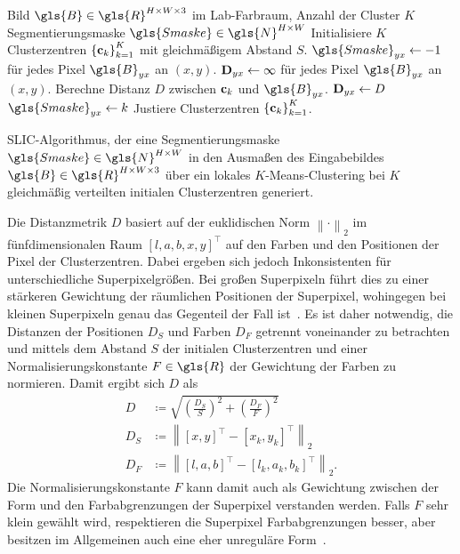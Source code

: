 \begin{algorithm}[t]
\centering
\begin{algorithmic}
  \REQUIRE{} Bild $\gls{B} \in \gls{R}^{H \times W \times 3}$ im Lab-Farbraum, Anzahl der Cluster $K$
  \ENSURE{} Segmentierungsmaske $\gls{Smaske} \in \gls{N}^{H \times W}$
  \STATE{} Initialisiere $K$ Clusterzentren ${\left\{\ve{c}_k\right\}}_{k=1}^K$ mit gleichmäßigem Abstand $S$.
  \STATE{} $\gls{Smaske}_{yx} \leftarrow -1$ für jedes Pixel $\gls{B}_{yx}$ an $\left(x,y\right)$.
  \STATE{} $\mathbf{D}_{yx} \leftarrow \infty$ für jedes Pixel $\gls{B}_{yx}$ an $\left(x,y\right)$.
  \REPEAT{}
        \STATE{} Berechne Distanz $D$ zwischen $\mathbf{c}_k$ und $\gls{B}_{yx}$.
          \STATE{} $\mathbf{D}_{yx} \leftarrow D$
          \STATE{} $\gls{Smaske}_{yx} \leftarrow k$
        \ENDIF{}
      \ENDFOR{}
    \ENDFOR{}
    \STATE{} Justiere Clusterzentren ${\left\{\ve{c}_k\right\}}_{k=1}^K$.
\end{algorithmic}
\caption[\gls{SLIC}]{\gls{SLIC}-Algorithmus, der eine Segmentierungsmaske $\gls{Smaske} \in \gls{N}^{H \times W}$ in den Ausmaßen des Eingabebildes $\gls{B} \in \gls{R}^{H \times W \times 3}$ über ein lokales $K$-Means-Clustering bei $K$ gleichmäßig verteilten initialen Clusterzentren generiert.}
\label{alg:slic}
\end{algorithm}

Die Distanzmetrik $D$ basiert auf der euklidischen Norm ${\left\|\cdot\right\|}_2$ im fünfdimensionalen Raum ${\left[l,a,b,x,y\right]}^{\top}$ auf den Farben und den Positionen der Pixel \bzw{} der Clusterzentren.
Dabei ergeben sich jedoch Inkonsistenten für unterschiedliche Superpixelgrößen.
Bei großen Superpixeln führt dies zu einer stärkeren Gewichtung der räumlichen Positionen der Superpixel, wohingegen bei kleinen Superpixeln genau das Gegenteil der Fall ist~\cite{slic}.
Es ist daher notwendig, die Distanzen der Positionen $D_S$ und Farben $D_F$ getrennt voneinander zu betrachten und mittels dem Abstand $S$ der initialen Clusterzentren und einer Normalisierungskonstante $F \in \gls{R}$ \bzgl{} der Gewichtung der Farben zu normieren.
Damit ergibt sich $D$ als~\cite{slic}
\begin{equation*}
\begin{split}
  D & \coloneqq \sqrt{{\left(\frac{D_S}{S}\right)}^2 + {\left(\frac{D_F}{F}\right)}^2}\\
  D_S & \coloneqq {\left\|{\left[x, y\right]}^{\top} - {\left[x_k, y_k\right]}^{\top}\right\|}_2\\
  D_F & \coloneqq {\left\|{\left[l, a, b\right]}^{\top} - {\left[l_k, a_k, b_k\right]}^{\top}\right\|}_2.
\end{split}
\end{equation*}
Die Normalisierungskonstante $F$ kann damit auch als Gewichtung zwischen der Form und den Farbabgrenzungen der Superpixel verstanden werden.
Falls $F$ sehr klein gewählt wird, respektieren die Superpixel Farbabgrenzungen besser, aber besitzen im Allgemeinen auch eine eher unreguläre Form~\cite{slic}.

